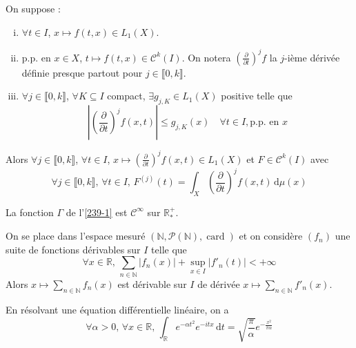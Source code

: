 	\begin{theorem}
		On suppose :
		\begin{enumerate}[(i)]
			\item $\forall t \in I$, $x \mapsto f(t,x) \in L_1(X)$.
			\item p.p. en $x \in X$, $t \mapsto f(t,x) \in \mathcal{C}^k(I)$. On notera $\left(\frac{\partial}{\partial t}\right)^j f$ la $j$-ième dérivée définie presque partout pour $j \in \llbracket 0, k \rrbracket$.
			\item $\forall j \in \llbracket 0, k \rrbracket$, $\forall K \subseteq I$ compact, $\exists g_{j,K} \in L_1(X)$ positive telle que
			\[ \left| \left(\frac{\partial}{\partial t}\right)^j f(x,t) \right| \leq g_{j,K}(x) \quad \forall t \in I, \text{p.p. en } x \]
		\end{enumerate}
		Alors $\forall j \in \llbracket 0, k \rrbracket$, $\forall t \in I$, $x \mapsto \left(\frac{\partial}{\partial t}\right)^j f(x,t) \in L_1(X)$ et $F \in \mathcal{C}^k(I)$ avec
		\[ \forall j \in \llbracket 0, k \rrbracket, \, \forall t \in I, \, F^{(j)}(t) = \int_X \left(\frac{\partial}{\partial t}\right)^j f(x, t) \, \mathrm{d}\mu(x) \]
	\end{theorem}


	\begin{example}
		La fonction $\Gamma$ de l'\cref{239-1} est $\mathcal{C}^\infty$ sur $\mathbb{R}^+_*$.
	\end{example}


	\begin{example}
		On se place dans l'espace mesuré $(\mathbb{N}, \mathcal{P}(\mathbb{N}), \operatorname{card})$ et on considère $(f_n)$ une suite de fonctions dérivables sur $I$ telle que
		\[ \forall x \in \mathbb{R}, \, \sum_{n \in \mathbb{N}} |f_n(x)| + \sup_{x \in I} |f'_n(t)| < +\infty \]
		Alors $x \mapsto \sum_{n \in \mathbb{N}} f_n(x)$ est dérivable sur $I$ de dérivée $x \mapsto \sum_{n \in \mathbb{N}} f'_n(x)$.
	\end{example}


	\begin{application}
		En résolvant une équation différentielle linéaire, on a
		\[ \forall \alpha > 0, \, \forall x \in \mathbb{R}, \, \int_{\mathbb{R}} e^{-\alpha t^2} e^{-itx} \, \mathrm{d}t = \sqrt{\frac{\pi}{\alpha}} e^{-\frac{x^2}{\pi \alpha}} \]
	\end{application}

